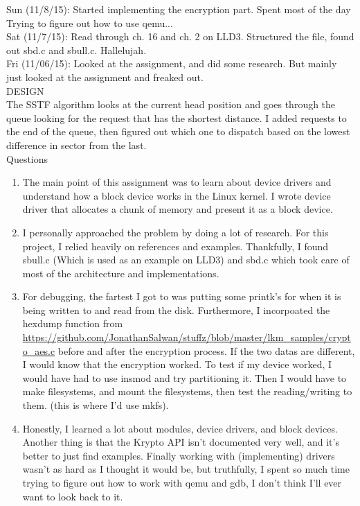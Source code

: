\documentclass[letterpaper,10pt]{article}
\begin{document}
Sun (11/8/15): Started implementing the encryption part. Spent most of the day Trying to figure out how to use qemu...\\

Sat (11/7/15): Read through ch. 16 and ch. 2 on LLD3. Structured the file, found out sbd.c and sbull.c. Hallelujah.\\

Fri (11/06/15): Looked at the assignment, and did some research. But mainly just looked at the assignment and freaked out.\\


{\LARGE DESIGN}\\
The SSTF algorithm looks at the current head position and goes through the queue looking for the request that has the shortest distance. I added requests to the end of the queue, then figured out which one to dispatch based on the lowest difference in sector from the last.\\

{\LARGE Questions}\\

\begin{enumerate}
\item The main point of this assignment was to learn about device drivers and understand how a block device works in the Linux kernel. I wrote device driver that allocates a chunk of memory and present it as a block device.\\
\item I personally approached the problem by doing a lot of research. For this project, I relied heavily on references and examples. Thankfully, I found sbull.c (Which is used as an example on LLD3) and sbd.c which took care of most of the architecture and implementations.\\
\item For debugging, the fartest I got to was putting some printk's for when it is being written to and read from the disk. Furthermore, I incorpoated the hexdump function from \url{https://github.com/JonathanSalwan/stuffz/blob/master/lkm_samples/crypto_aes.c} before and after the encryption process. If the two datas are different, I would know that the encryption worked. To test if my device worked, I would have had to use insmod and try partitioning it. Then I would have to make filesystems, and mount the filesystems, then test the reading/writing to them. (this is where I'd use mkfs).\\
\item Honestly, I learned a lot about modules, device drivers, and block devices. Another thing is that the Krypto API isn't documented very well, and it's better to just find examples. Finally working with (implementing) drivers wasn't as hard as I thought it would be, but truthfully, I spent so much time trying to figure out how to work with qemu and gdb, I don't think I'll ever want to look back to it.\\
\end{enumerate}




%
%
%
\end{document}
